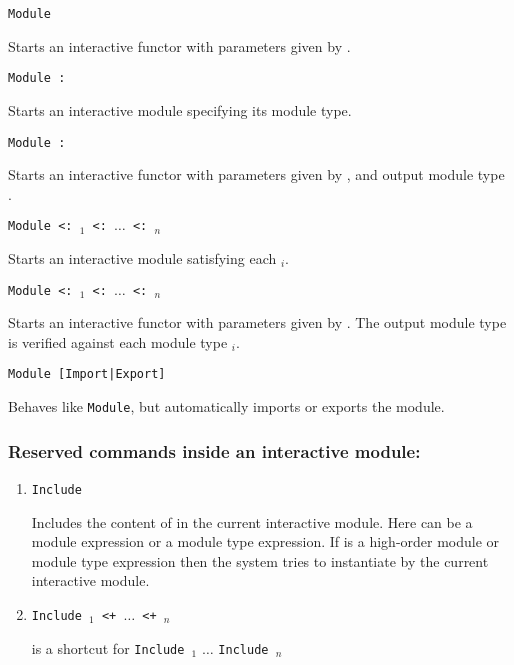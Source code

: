 \begin{Variants}

\item{\tt Module {\ident} {\modbindings}}

  Starts an interactive functor with parameters given by {\modbindings}.

\item{\tt Module {\ident} \verb.:. {\modtype}}

  Starts an interactive module specifying its module type. 

\item{\tt Module {\ident} {\modbindings} \verb.:. {\modtype}}

  Starts an interactive functor with parameters given by
  {\modbindings}, and output module type {\modtype}.

\item{\tt Module {\ident} \verb.<:. {\modtype$_1$} \verb.<:. $\ldots$ \verb.<:.{ \modtype$_n$}}

  Starts an interactive module satisfying each {\modtype$_i$}. 

\item{\tt Module {\ident} {\modbindings} \verb.<:. {\modtype$_1$} \verb.<:. $\ldots$ \verb.<:. {\modtype$_n$}}

  Starts an interactive functor with parameters given by
  {\modbindings}. The output module type is verified against each
  module type {\modtype$_i$}.

\item\texttt{Module [Import|Export]}

  Behaves like \texttt{Module}, but automatically imports or exports
  the module.

\end{Variants}
\subsubsection{Reserved commands inside an interactive module:
}
\begin{enumerate}
\item {\tt Include {\module}}

  Includes the content of {\module} in the current interactive
 module. Here {\module} can be a module expression or a module type
 expression. If {\module} is a high-order module or module type
 expression then the system tries to instantiate {\module}
 by the current interactive module.

\item {\tt Include {\module$_1$} \verb.<+. $\ldots$ \verb.<+. {\module$_n$}} 

is a shortcut for {\tt Include {\module$_1$}}  $\ldots$ {\tt Include {\module$_n$}}
\end{enumerate}
